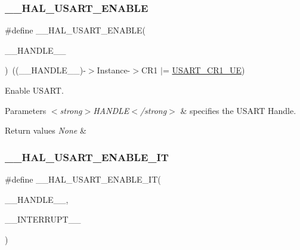 \subsubsection{\texorpdfstring{\+\_\+\+\_\+\+H\+A\+L\+\_\+\+U\+S\+A\+R\+T\+\_\+\+E\+N\+A\+B\+LE}{\_\_HAL\_USART\_ENABLE}}
{\footnotesize\ttfamily \#define \+\_\+\+\_\+\+H\+A\+L\+\_\+\+U\+S\+A\+R\+T\+\_\+\+E\+N\+A\+B\+LE(\begin{DoxyParamCaption}\item[{}]{\+\_\+\+\_\+\+H\+A\+N\+D\+L\+E\+\_\+\+\_\+ }\end{DoxyParamCaption})~((\+\_\+\+\_\+\+H\+A\+N\+D\+L\+E\+\_\+\+\_\+)-\/$>$Instance-\/$>$C\+R1 $\vert$=  \hyperlink{group___peripheral___registers___bits___definition_ga2bb650676aaae4a5203f372d497d5947}{U\+S\+A\+R\+T\+\_\+\+C\+R1\+\_\+\+UE})}



Enable U\+S\+A\+RT. 


\begin{DoxyParams}{Parameters}
{\em $<$strong$>$\+H\+A\+N\+D\+L\+E$<$/strong$>$} & specifies the U\+S\+A\+RT Handle. \\
\hline
\end{DoxyParams}

\begin{DoxyRetVals}{Return values}
{\em None} & \\
\hline
\end{DoxyRetVals}
\mbox{\label{group___u_s_a_r_t___exported___macros_ga2258521c741456b4254064958ca7ef51}} 
\subsubsection{\texorpdfstring{\+\_\+\+\_\+\+H\+A\+L\+\_\+\+U\+S\+A\+R\+T\+\_\+\+E\+N\+A\+B\+L\+E\+\_\+\+IT}{\_\_HAL\_USART\_ENABLE\_IT}}
{\footnotesize\ttfamily \#define \+\_\+\+\_\+\+H\+A\+L\+\_\+\+U\+S\+A\+R\+T\+\_\+\+E\+N\+A\+B\+L\+E\+\_\+\+IT(\begin{DoxyParamCaption}\item[{}]{\+\_\+\+\_\+\+H\+A\+N\+D\+L\+E\+\_\+\+\_\+,  }\item[{}]{\+\_\+\+\_\+\+I\+N\+T\+E\+R\+R\+U\+P\+T\+\_\+\+\_\+ }\end{DoxyParamCaption})}

